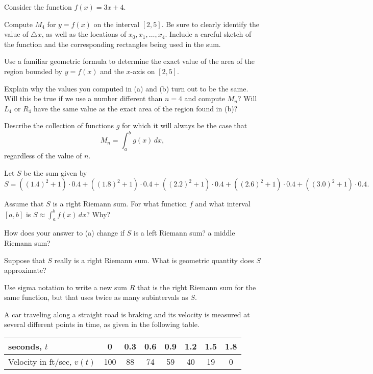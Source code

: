 \begin{exercises} 
  \item Consider the function $f(x) = 3x + 4$.
  \ba
  	\item Compute $M_4$ for $y=f(x)$ on the interval $[2,5]$.  Be sure to clearly identify the value of $\triangle x$, as well as the locations of $x_0, x_1, \ldots, x_4$.  Include a careful sketch of the function and the corresponding rectangles being used in the sum.
	\item Use a familiar geometric formula to determine the exact value of the area of the region bounded by $y = f(x)$ and the $x$-axis on $[2,5]$.
	\item Explain why the values you computed in (a) and (b) turn out to be the same.  Will this be true if we use a number different than $n = 4$ and compute $M_n$?  Will $L_4$ or $R_4$ have the same value as the exact area of the region found in (b)?
	\item Describe the collection of functions $g$ for which it will always be the case that
	$$M_n = \int_a^b g(x) \, dx,$$
	regardless of the value of $n$.
  \ea	
  \item Let $S$ be the sum given by
  $$S = ((1.4)^2 + 1) \cdot 0.4 + ((1.8)^2 + 1) \cdot 0.4 + ((2.2)^2 + 1) \cdot 0.4 + ((2.6)^2 + 1) \cdot 0.4 +((3.0)^2 + 1) \cdot 0.4.$$
  	\ba
		\item Assume that $S$ is a right Riemann sum.  For what function $f$ and what interval $[a,b]$ is $S \approx \int_a^b f(x) \,dx$?  Why?
		\item How does your answer to (a) change if $S$ is a left Riemann sum?  a middle Riemann sum?
		\item Suppose that $S$ really is a right Riemann sum.  What is geometric quantity does $S$ approximate?
		\item Use sigma notation to write a new sum $R$ that is the right Riemann sum for the same function, but that uses twice as many subintervals as $S$.
	\ea
	\item A car traveling along a straight road is braking and its velocity is measured at several different points in time, as given in the following table.
\begin{center}
\begin{tabular}{|l|c|c|c|c|c|c|c|}
\hline
seconds, $t$ & 0 & 0.3 & 0.6 & 0.9 & 1.2 & 1.5 & 1.8 \\
\hline
Velocity in ft/sec, $v(t)$ & 100 & 88 & 74 & 59 & 40 & 19 & 0 \\
\hline
\end{tabular}

\end{center}
\end{exercises}
